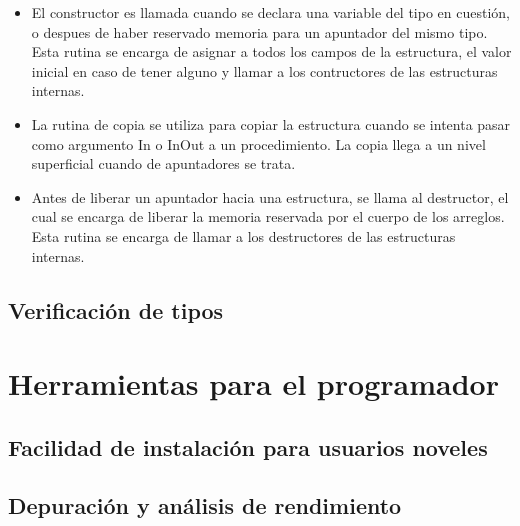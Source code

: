 \begin{itemize}

  \item El constructor es llamada cuando se declara una variable del tipo en
  cuestión, o despues de haber reservado memoria para un apuntador del mismo
  tipo. Esta rutina se encarga de asignar a todos los campos de la estructura,
  el valor inicial en caso de tener alguno y llamar a los contructores de las
  estructuras internas.

  \item La rutina de copia se utiliza para copiar la estructura cuando se
  intenta pasar como argumento In o InOut a un procedimiento. La copia llega a
  un nivel superficial cuando de apuntadores se trata.

  \item Antes de liberar un apuntador hacia una estructura, se llama al
  destructor, el cual se encarga de liberar la memoria reservada por el cuerpo
  de los arreglos. Esta rutina se encarga de llamar a los destructores de las
  estructuras internas.

\end{itemize}


\subsection{Verificación de tipos}
\blindtext[1]

\section{Herramientas para el programador}
\subsection{Facilidad de instalación para usuarios noveles}
\blindtext[1]

\subsection{Depuración y análisis de rendimiento}
\blindtext[1]
